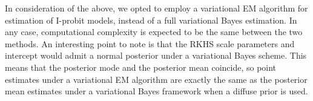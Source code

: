\documentclass[a4paper,showframe,11pt]{report}
\begin{document}
In consideration of the above, we opted to employ a variational EM algorithm for estimation of I-probit models, instead of a full variational Bayes estimation.
In any case, computational complexity is expected to be the same between the two methods.
An interesting point to note is that the RKHS scale parameters and intercept would admit a normal posterior under a variational Bayes scheme. 
This means that the posterior mode and the posterior mean coincide, so point estimates under a variational EM algorithm are exactly the same as the posterior mean estimates under a variational Bayes framework when a diffuse prior is used.

\hClosingStuffStandalone
\end{document}
